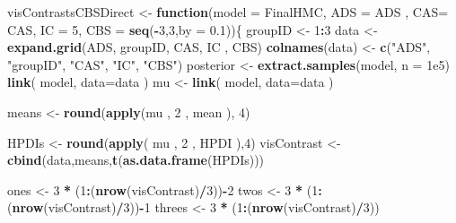 \documentclass[10pt,dvipsnames,enabledeprecatedfontcommands]{scrartcl}
\newenvironment{Shaded}{\begin{snugshade}}{\end{snugshade}}
\newcommand{\KeywordTok}[1]{\textcolor[rgb]{0.13,0.29,0.53}{\textbf{#1}}}
\newcommand{\DataTypeTok}[1]{\textcolor[rgb]{0.13,0.29,0.53}{#1}}
\newcommand{\DecValTok}[1]{\textcolor[rgb]{0.00,0.00,0.81}{#1}}
\newcommand{\FloatTok}[1]{\textcolor[rgb]{0.00,0.00,0.81}{#1}}
\newcommand{\StringTok}[1]{\textcolor[rgb]{0.31,0.60,0.02}{#1}}
\newcommand{\ControlFlowTok}[1]{\textcolor[rgb]{0.13,0.29,0.53}{\textbf{#1}}}
\newcommand{\OperatorTok}[1]{\textcolor[rgb]{0.81,0.36,0.00}{\textbf{#1}}}
\newcommand{\NormalTok}[1]{#1}
\begin{document}
\begin{Shaded}
\begin{Highlighting}[]
\NormalTok{visContrastsCBSDirect <-}\StringTok{ }\ControlFlowTok{function}\NormalTok{(}\DataTypeTok{model =}\NormalTok{ FinalHMC, }\DataTypeTok{ADS =}\NormalTok{ ADS , }\DataTypeTok{CAS=}\NormalTok{ CAS, }\DataTypeTok{IC =}  \DecValTok{5}\NormalTok{,}
                            \DataTypeTok{CBS =} \KeywordTok{seq}\NormalTok{(}\OperatorTok{-}\DecValTok{3}\NormalTok{,}\DecValTok{3}\NormalTok{,}\DataTypeTok{by  =} \FloatTok{0.1}\NormalTok{))\{}
\NormalTok{  groupID <-}\StringTok{ }\DecValTok{1}\OperatorTok{:}\DecValTok{3}
\NormalTok{  data <-}\StringTok{ }\KeywordTok{expand.grid}\NormalTok{(ADS, groupID, CAS, IC , CBS)}
  \KeywordTok{colnames}\NormalTok{(data) <-}\StringTok{ }\KeywordTok{c}\NormalTok{(}\StringTok{"ADS"}\NormalTok{, }\StringTok{"groupID"}\NormalTok{, }\StringTok{"CAS"}\NormalTok{, }\StringTok{"IC"}\NormalTok{, }\StringTok{"CBS"}\NormalTok{)}
\NormalTok{  posterior <-}\StringTok{ }\KeywordTok{extract.samples}\NormalTok{(model, }\DataTypeTok{n =} \FloatTok{1e5}\NormalTok{)}
  \KeywordTok{link}\NormalTok{( model, }\DataTypeTok{data=}\NormalTok{data ) }
\NormalTok{  mu <-}\StringTok{ }\KeywordTok{link}\NormalTok{( model, }\DataTypeTok{data=}\NormalTok{data ) }
  
\NormalTok{  means <-}\StringTok{  }\KeywordTok{round}\NormalTok{(}\KeywordTok{apply}\NormalTok{(mu , }\DecValTok{2}\NormalTok{ , mean ), }\DecValTok{4}\NormalTok{)}
  
\NormalTok{  HPDIs <-}\StringTok{ }\KeywordTok{round}\NormalTok{(}\KeywordTok{apply}\NormalTok{( mu , }\DecValTok{2}\NormalTok{ , HPDI ),}\DecValTok{4}\NormalTok{)}
\NormalTok{  visContrast <-}\StringTok{ }\KeywordTok{cbind}\NormalTok{(data,means,}\KeywordTok{t}\NormalTok{(}\KeywordTok{as.data.frame}\NormalTok{(HPDIs)))}
  
\NormalTok{  ones <-}\StringTok{ }\DecValTok{3} \OperatorTok{*}\StringTok{ }\NormalTok{(}\DecValTok{1}\OperatorTok{:}\NormalTok{(}\KeywordTok{nrow}\NormalTok{(visContrast)}\OperatorTok{/}\DecValTok{3}\NormalTok{))}\OperatorTok{-}\DecValTok{2}
\NormalTok{  twos <-}\StringTok{ }\DecValTok{3} \OperatorTok{*}\StringTok{ }\NormalTok{(}\DecValTok{1}\OperatorTok{:}\NormalTok{(}\KeywordTok{nrow}\NormalTok{(visContrast)}\OperatorTok{/}\DecValTok{3}\NormalTok{))}\OperatorTok{-}\DecValTok{1}
\NormalTok{  threes <-}\StringTok{ }\DecValTok{3} \OperatorTok{*}\StringTok{ }\NormalTok{(}\DecValTok{1}\OperatorTok{:}\NormalTok{(}\KeywordTok{nrow}\NormalTok{(visContrast)}\OperatorTok{/}\DecValTok{3}\NormalTok{))}
  

\end{Highlighting}
\end{Shaded}
\end{document}
